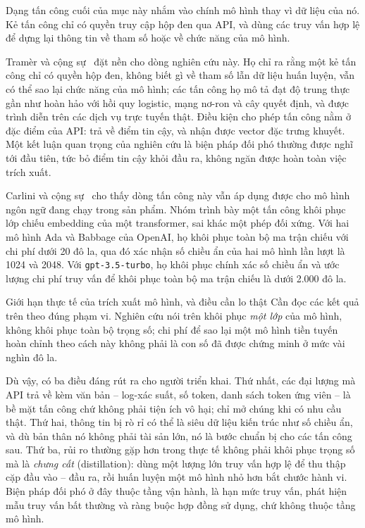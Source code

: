 Dạng tấn công cuối của mục này nhắm vào chính mô hình thay vì dữ liệu của nó. Kẻ tấn công chỉ có quyền truy cập hộp đen qua API, và dùng các truy vấn hợp lệ để dựng lại thông tin về tham số hoặc về chức năng của mô hình.

Tramèr và cộng sự~\cite{tramer2016stealing} đặt nền cho dòng nghiên cứu này. Họ chỉ ra rằng một kẻ tấn công chỉ có quyền hộp đen, không biết gì về tham số lẫn dữ liệu huấn luyện, vẫn có thể sao lại chức năng của mô hình; các tấn công họ mô tả đạt độ trung thực gần như hoàn hảo với hồi quy logistic, mạng nơ-ron và cây quyết định, và được trình diễn trên các dịch vụ trực tuyến thật. Điều kiện cho phép tấn công nằm ở đặc điểm của API: trả về điểm tin cậy, và nhận được vector đặc trưng khuyết. Một kết luận quan trọng của nghiên cứu là biện pháp đối phó thường được nghĩ tới đầu tiên, tức bỏ điểm tin cậy khỏi đầu ra, không ngăn được hoàn toàn việc trích xuất.

Carlini và cộng sự~\cite{carlini2024stealing} cho thấy dòng tấn công này vẫn áp dụng được cho mô hình ngôn ngữ đang chạy trong sản phẩm. Nhóm trình bày một tấn công khôi phục lớp chiếu embedding của một transformer, sai khác một phép đối xứng. Với hai mô hình Ada và Babbage của OpenAI, họ khôi phục toàn bộ ma trận chiếu với chi phí dưới 20 đô la, qua đó xác nhận số chiều ẩn của hai mô hình lần lượt là 1024 và 2048. Với \texttt{gpt-3.5-turbo}, họ khôi phục chính xác số chiều ẩn và ước lượng chi phí truy vấn để khôi phục toàn bộ ma trận chiếu là dưới 2.000 đô la.

\begin{assess}{Giới hạn thực tế của trích xuất mô hình, và điều cần lo thật}
Cần đọc các kết quả trên theo đúng phạm vi. Nghiên cứu nói trên khôi phục \emph{một lớp} của mô hình, không khôi phục toàn bộ trọng số; chi phí để sao lại một mô hình tiền tuyến hoàn chỉnh theo cách này không phải là con số đã được chứng minh ở mức vài nghìn đô la.

Dù vậy, có ba điều đáng rút ra cho người triển khai. Thứ nhất, các đại lượng mà API trả về kèm văn bản -- log-xác suất, số token, danh sách token ứng viên -- là bề mặt tấn công chứ không phải tiện ích vô hại; chỉ mở chúng khi có nhu cầu thật. Thứ hai, thông tin bị rò rỉ có thể là siêu dữ liệu kiến trúc như số chiều ẩn, và dù bản thân nó không phải tài sản lớn, nó là bước chuẩn bị cho các tấn công sau. Thứ ba, rủi ro thường gặp hơn trong thực tế không phải khôi phục trọng số mà là \emph{chưng cất} (distillation): dùng một lượng lớn truy vấn hợp lệ để thu thập cặp đầu vào -- đầu ra, rồi huấn luyện một mô hình nhỏ hơn bắt chước hành vi. Biện pháp đối phó ở đây thuộc tầng vận hành, là hạn mức truy vấn, phát hiện mẫu truy vấn bất thường và ràng buộc hợp đồng sử dụng, chứ không thuộc tầng mô hình.
\end{assess}
